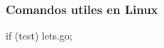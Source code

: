 \begin{frame}
  \frametitle {Comandos utiles en Linux}

  \begin{semiverbatim}
    if (test)
    {
      lets.go;
    }
  \end{semiverbatim}
\end{frame}